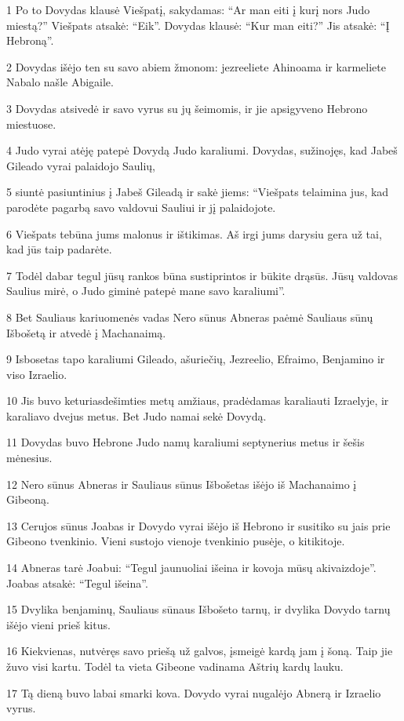 \par 1 Po to Dovydas klausė Viešpatį, sakydamas: “Ar man eiti į kurį nors Judo miestą?” Viešpats atsakė: “Eik”. Dovydas klausė: “Kur man eiti?” Jis atsakė: “Į Hebroną”. 
\par 2 Dovydas išėjo ten su savo abiem žmonom: jezreeliete Ahinoama ir karmeliete Nabalo našle Abigaile. 
\par 3 Dovydas atsivedė ir savo vyrus su jų šeimomis, ir jie apsigyveno Hebrono miestuose. 
\par 4 Judo vyrai atėję patepė Dovydą Judo karaliumi. Dovydas, sužinojęs, kad Jabeš Gileado vyrai palaidojo Saulių, 
\par 5 siuntė pasiuntinius į Jabeš Gileadą ir sakė jiems: “Viešpats telaimina jus, kad parodėte pagarbą savo valdovui Sauliui ir jį palaidojote. 
\par 6 Viešpats tebūna jums malonus ir ištikimas. Aš irgi jums darysiu gera už tai, kad jūs taip padarėte. 
\par 7 Todėl dabar tegul jūsų rankos būna sustiprintos ir būkite drąsūs. Jūsų valdovas Saulius mirė, o Judo giminė patepė mane savo karaliumi”. 
\par 8 Bet Sauliaus kariuomenės vadas Nero sūnus Abneras paėmė Sauliaus sūnų Išbošetą ir atvedė į Machanaimą. 
\par 9 Isbosetas tapo karaliumi Gileado, ašuriečių, Jezreelio, Efraimo, Benjamino ir viso Izraelio. 
\par 10 Jis buvo keturiasdešimties metų amžiaus, pradėdamas karaliauti Izraelyje, ir karaliavo dvejus metus. Bet Judo namai sekė Dovydą. 
\par 11 Dovydas buvo Hebrone Judo namų karaliumi septynerius metus ir šešis mėnesius. 
\par 12 Nero sūnus Abneras ir Sauliaus sūnus Išbošetas išėjo iš Machanaimo į Gibeoną. 
\par 13 Cerujos sūnus Joabas ir Dovydo vyrai išėjo iš Hebrono ir susitiko su jais prie Gibeono tvenkinio. Vieni sustojo vienoje tvenkinio pusėje, o kiti­kitoje. 
\par 14 Abneras tarė Joabui: “Tegul jaunuoliai išeina ir kovoja mūsų akivaizdoje”. Joabas atsakė: “Tegul išeina”. 
\par 15 Dvylika benjaminų, Sauliaus sūnaus Išbošeto tarnų, ir dvylika Dovydo tarnų išėjo vieni prieš kitus. 
\par 16 Kiekvienas, nutvėręs savo priešą už galvos, įsmeigė kardą jam į šoną. Taip jie žuvo visi kartu. Todėl ta vieta Gibeone vadinama Aštrių kardų lauku. 
\par 17 Tą dieną buvo labai smarki kova. Dovydo vyrai nugalėjo Abnerą ir Izraelio vyrus. 
